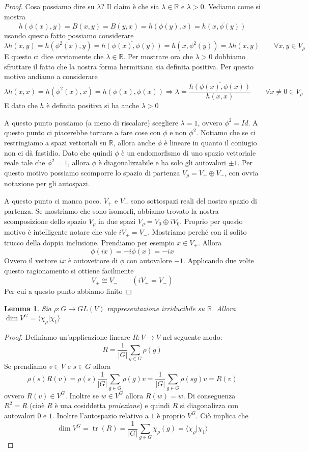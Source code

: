 \documentclass[11pt]{article}
\theoremstyle{plain}
\newtheorem{lemma}[thm]{Lemma}
\theoremstyle{definition}
\theoremstyle{remark}
\newcommand{\R}{\mathbb{R}}
\DeclareMathOperator{\tr}{tr}
\begin{document}
\begin{proof}
Cosa possiamo dire su $\lambda$? Il claim è che sia $\lambda \in \R$ e $\lambda > 0$. Vediamo come si mostra
\[h(\phi(x), y) = B(x, y) = B(y, x) = h(\phi(y), x) = \overline{h(x, \phi(y))} \]
usando questo fatto possiamo considerare 
\[ \lambda h(x, y) = h(\phi^2(x), y) = \overline{h(\phi(x), \phi(y))} = h(x, \phi^2(y)) = \overline{\lambda} h(x, y) \qquad \forall x, y \in V_\rho\]
E questo ci dice ovviamente che $\lambda \in \R$. Per mostrare ora che $\lambda > 0$ dobbiamo sfruttare il fatto che la nostra forma hermitiana sia definita positiva. Per questo motivo andiamo a considerare
\[\lambda h(x, x) = h (\phi^2(x), x) = \overline{h(\phi(x), \phi(x))} \Rightarrow \lambda = \dfrac{\overline{h(\phi(x), \phi(x))}}{ h(x,x)} \qquad \forall x \neq 0 \in V_\rho\]
E dato che $h $ è definita positiva si ha anche $\lambda > 0$

A questo punto possiamo (a meno di riscalare) scegliere $\lambda = 1$, ovvero $\phi^2 = Id$. A questo punto ci piacerebbe tornare a fare cose con $\phi$ e non $\phi^2$. Notiamo che se ci restringiamo a spazi vettoriali su $\R$, allora anche $\phi$ è lineare in quanto il coniugio non ci dà fastidio. Dato che quindi $\phi$ è un endomorfismo di uno spazio vettoriale reale tale che $\phi^2=1$, allora $\phi$ è diagonalizzabile e ha solo gli autovalori $\pm 1$.  Per questo motivo possiamo scomporre lo spazio di partenza $V_\rho = V_+ \oplus V_-$, con ovvia notazione per gli autospazi.

A questo punto ci manca poco. $V_+$ e $V_-$ sono sottospazi reali del nostro spazio di partenza. Se mostriamo che sono isomorfi, abbiamo trovato la nostra scomposizione dello spazio $V_\rho$ in due spazi $V_\rho = V_0 \oplus iV_0$.
Proprio per questo motivo è intelligente notare che vale $i V_+ = V_-$.
Mostriamo perché con il solito trucco della doppia inclusione. Prendiamo per esempio $x \in V_+$. Allora 
\[ \phi(ix) = - i \phi(x) = -i x \]
Ovvero il vettore $ix$ è autovettore di $\phi$ con autovalore $-1$. Applicando due volte questo ragionamento si ottiene facilmente
\[ V_+ \cong V_- \qquad (i V_+ = V_-)\]
Per cui a questo punto abbiamo finito
\end{proof}


\begin{lemma}
Sia $\rho:G\to GL(V)$ rappresentazione irriducibile su $\R$. Allora $\dim V^G = \langle\chi_\rho|\chi_1\rangle$
\end{lemma}
\begin{proof}
Definiamo un'applicazione lineare $R:V\to V$ nel seguente modo:
\[ R = \frac{1}{|G|} \sum_{g\in G}{\rho(g)} \]
Se prendiamo $v\in V$ e $s\in G$ allora
\[ \rho(s) R(v) = \rho(s)\frac{1}{|G|} \sum_{g\in G}{\rho(g)v} = \frac{1}{|G|} \sum_{g\in G}{\rho(sg)v} = R(v)\]
ovvero $R(v)\in V^G$.
Inoltre se $w\in V^G$ allora $R(w)=w$. Di conseguenza $R^2 = R$ (cioè $R$ è una cosiddetta \emph{proiezione})
e quindi $R$ si diagonalizza con autovalori $0$ e $1$. Inoltre l'autospazio relativo a $1$ è proprio $V^G$.
Ciò implica che
\[ \dim V^G = \tr(R) = \frac{1}{|G|} \sum_{g\in G}{\chi_\rho(g)} = \langle\chi_\rho|\chi_1\rangle \]
\end{proof}
\end{document}
